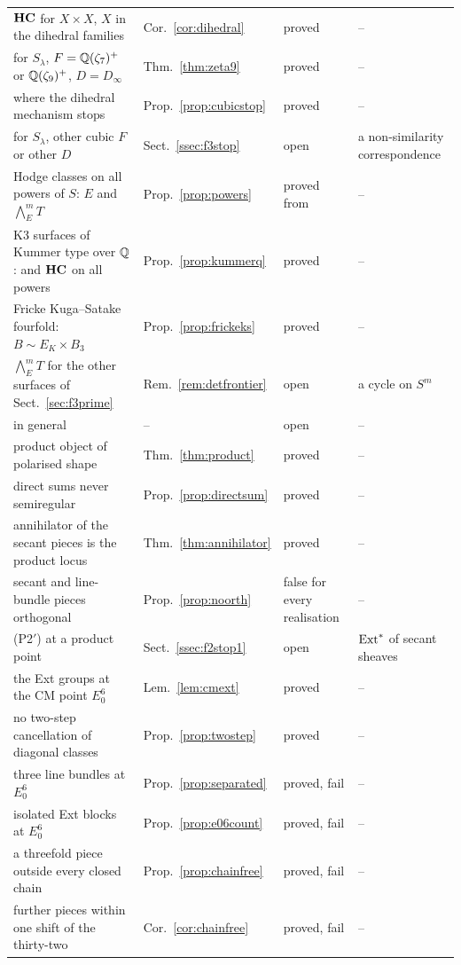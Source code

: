 \begin{table}[hbt!]
\begin{ruledtabular}
\begin{tabular}{llll}
$\mathbf{HC}$ for $X\times X$, $X$ in the dihedral families & Cor.~\ref{cor:dihedral} & proved & -- \\
\Fiii{} for $S_{\lambda}$, $F=\mathbb{Q}(\zeta_{7})^{+}$ or $\mathbb{Q}(\zeta_{9})^{+}$, $D=D_{\infty}$ & Thm.~\ref{thm:zeta9} & proved & -- \\
where the dihedral mechanism stops & Prop.~\ref{prop:cubicstop} & proved & -- \\
\Fiii{} for $S_{\lambda}$, other cubic $F$ or other $D$ & Sect.~\ref{ssec:f3stop} & open & a non-similarity correspondence \\
Hodge classes on all powers of $S$: $E$ and $\bigwedge^{m}_{E}T$ & Prop.~\ref{prop:powers} & proved from \cite{Var25} & -- \\
K3 surfaces of Kummer type over $\mathbb{Q}$: \Fiii{} and $\mathbf{HC}$ on all powers & Prop.~\ref{prop:kummerq} & proved & -- \\
Fricke Kuga--Satake fourfold: $B\sim E_{K}\times B_{3}$ & Prop.~\ref{prop:frickeks} & proved & -- \\
$\bigwedge^{m}_{E}T$ for the other surfaces of Sect.~\ref{sec:f3prime} & Rem.~\ref{rem:detfrontier} & open & a cycle on $S^{m}$ \\
\Fiii{} in general & -- & open & -- \\
product object of polarised shape & Thm.~\ref{thm:product} & proved & -- \\
direct sums never semiregular & Prop.~\ref{prop:directsum} & proved & -- \\
annihilator of the secant pieces is the product locus & Thm.~\ref{thm:annihilator} & proved & -- \\
secant and line-bundle pieces orthogonal & Prop.~\ref{prop:noorth} & false for every realisation & -- \\
(P2$'$) at a product point & Sect.~\ref{ssec:f2stop1} & open & $\mathrm{Ext}^{*}$ of secant sheaves \\
the Ext groups at the CM point $E_{0}^{6}$ & Lem.~\ref{lem:cmext} & proved & -- \\
no two-step cancellation of diagonal classes & Prop.~\ref{prop:twostep} & proved & -- \\
three line bundles at $E_{0}^{6}$ & Prop.~\ref{prop:separated} & proved, fail & -- \\
isolated Ext blocks at $E_{0}^{6}$ & Prop.~\ref{prop:e06count} & proved, fail & -- \\
a threefold piece outside every closed chain & Prop.~\ref{prop:chainfree} & proved, fail & -- \\
further pieces within one shift of the thirty-two & Cor.~\ref{cor:chainfree} & proved, fail & -- \\

\end{tabular}
\end{ruledtabular}
\end{table}
